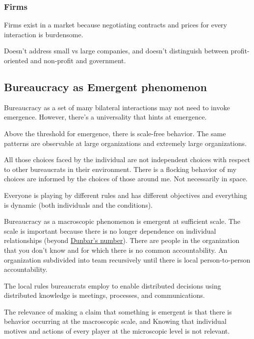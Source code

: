 \subsubsection{Firms}
Firms exist in a market because negotiating contracts and prices for every interaction is burdensome. 

Doesn't address small vs large companies, and doesn't distinguish between profit-oriented and non-profit and government. 


\subsection{Bureaucracy as Emergent phenomenon}
Bureaucracy as a set of many bilateral interactions may not need to invoke emergence. However, there's a universality that hints at emergence. 

Above the threshold for emergence, there is scale-free behavior. The same patterns are observable at large organizations and extremely large organizations.

All those choices faced by the individual are not independent choices with respect to other bureaucrats in their environment. There is a flocking behavior of my choices are informed by the choices of those around me. Not necessarily in space.

Everyone is playing by different rules and has different objectives and everything is dynamic (both individuals and the conditions). 

Bureaucracy as a macroscopic phenomenon is emergent at sufficient scale. The scale is important because there is no longer dependence on individual relationships (beyond \href{https://en.wikipedia.org/wiki/Dunbar\%27s_number}{Dunbar's number}). There are people in the organization that you don't know and for which there is no common accountability. An organization subdivided into team recursively until there is local person-to-person accountability.  

The local rules bureaucrats employ to enable distributed decisions using distributed knowledge is meetings, processes, and communications. 

The relevance of making a claim that something is emergent is that there is behavior occurring at the macroscopic scale, and Knowing that individual motives and actions of every player at the microscopic level is not relevant.

